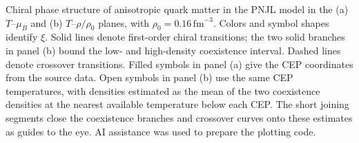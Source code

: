 Chiral phase structure of anisotropic quark matter in the PNJL model in the
(a) $T$--$\mu_B$ and (b) $T$--$\rho/\rho_0$ planes, with
$\rho_0=0.16\,\mathrm{fm}^{-3}$. Colors and symbol shapes identify $\xi$.
Solid lines denote first-order chiral transitions; the two solid branches in
panel (b) bound the low- and high-density coexistence interval. Dashed lines
denote crossover transitions. Filled symbols in panel (a) give the CEP
coordinates from the source data. Open symbols in panel (b) use the same CEP
temperatures, with densities estimated as the mean of the two coexistence
densities at the nearest available temperature below each CEP. The short
joining segments close the coexistence branches and crossover curves onto
these estimates as guides to the eye. AI assistance was used to prepare the
plotting code.

